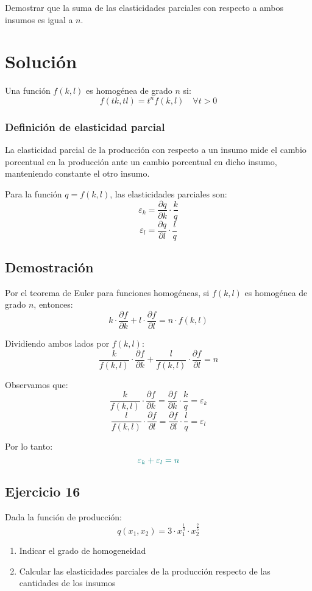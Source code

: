 \documentclass{article}
\begin{document}
Demostrar que la suma de las elasticidades parciales con respecto a ambos insumos es igual a \(n\).


\newpage
\section*{Solución}

Una función $f(k,l)$ es homogénea de grado $n$ si:
$$f(tk, tl) = t^n f(k,l) \quad \forall t > 0$$

\subsubsection*{Definición de elasticidad parcial}
La elasticidad parcial de la producción con respecto a un insumo mide el cambio porcentual en la producción ante un cambio porcentual en dicho insumo, manteniendo constante el otro insumo.

Para la función $q = f(k,l)$, las elasticidades parciales son:
$$\varepsilon_k = \frac{\partial q}{\partial k} \cdot \frac{k}{q}$$
$$\varepsilon_l = \frac{\partial q}{\partial l} \cdot \frac{l}{q}$$

\subsection*{Demostración}

Por el teorema de Euler para funciones homogéneas, si $f(k,l)$ es homogénea de grado $n$, entonces:
$$k \cdot \frac{\partial f}{\partial k} + l \cdot \frac{\partial f}{\partial l} = n \cdot f(k,l)$$

Dividiendo ambos lados por $f(k,l)$:
$$\frac{k}{f(k,l)} \cdot \frac{\partial f}{\partial k} + \frac{l}{f(k,l)} \cdot \frac{\partial f}{\partial l} = n$$

Observamos que:
$$\frac{k}{f(k,l)} \cdot \frac{\partial f}{\partial k} = \frac{\partial f}{\partial k} \cdot \frac{k}{q} = \varepsilon_k$$
$$\frac{l}{f(k,l)} \cdot \frac{\partial f}{\partial l} = \frac{\partial f}{\partial l} \cdot \frac{l}{q} = \varepsilon_l$$

Por lo tanto:
$$\color{teal} \varepsilon_k + \varepsilon_l = n$$

\newpage
\subsection{Ejercicio 16}
Dada la función de producción:
\[
q(x_1,x_2) = 3 \cdot x_1^{\frac{1}{3}} \cdot x_2^{\frac{2}{5}}
\]

\begin{enumerate}
  \item Indicar el grado de homogeneidad
  \item Calcular las elasticidades parciales de la producción respecto de las cantidades de los insumos
\end{enumerate}
\end{document}
